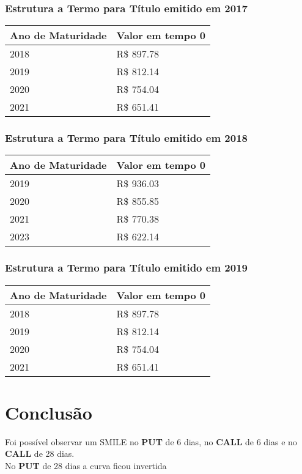 \documentclass[
	11pt,				%
	openright,			%
	oneside,			%
	a4paper,			%
	english,			%
	french,				%
	spanish,			%
	brazil,				%
	]{abntex2}
\begin{document}
\newpage
\subsection{Estrutura a Termo para Título emitido em 2017}
\begin{tabular}{ll}
\toprule
\multicolumn{1}{c}{Ano de Maturidade} & Valor em tempo 0 \\
\midrule
2018 & R\$ 897.78 \\
2019 & R\$ 812.14 \\
2020 & R\$ 754.04\\
2021 & R\$ 651.41
\end{tabular}
\begin{figure}[h]
\end{figure}

\newpage
\subsection{Estrutura a Termo para Título emitido em 2018}
\begin{tabular}{ll}
\toprule
\multicolumn{1}{c}{Ano de Maturidade} & Valor em tempo 0 \\
\midrule
2019 & R\$ 936.03 \\
2020 & R\$ 855.85 \\
2021 & R\$ 770.38\\
2023 & R\$ 622.14
\end{tabular}
\begin{figure}[h]
\end{figure}

\newpage
\subsection{Estrutura a Termo para Título emitido em 2019}
\begin{tabular}{ll}
\toprule
\multicolumn{1}{c}{Ano de Maturidade} & Valor em tempo 0 \\
\midrule
2018 & R\$ 897.78 \\
2019 & R\$ 812.14 \\
2020 & R\$ 754.04\\
2021 & R\$ 651.41
\end{tabular}

\begin{figure}[h]
\end{figure}

\chapter{Conclusão}
Foi possível observar um SMILE no \textbf{PUT} de 6 dias, no \textbf{CALL} de 6 dias e no \textbf{CALL} de 28 dias.\\
No \textbf{PUT} de 28 dias a curva ficou invertida
\end{document}
